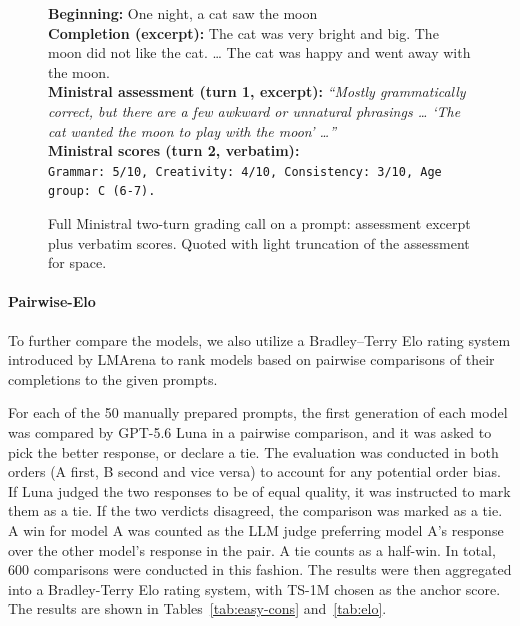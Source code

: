 \documentclass{article}
\newif\ifmarkup
\DeclareRobustCommand{\ins}[1]{\ifmarkup\textbf{#1}\else#1\fi}
\DeclareRobustCommand{\del}[1]{\ifmarkup\sout{#1}\fi}
\begin{document}
\begin{figure}[H]
  \centering
  \begin{tcolorbox}[storybox, title={Ministral grading call (TTS-33M)}]
    \textbf{Beginning:} One night, a cat saw the moon \\[4pt]
    \textbf{Completion (excerpt):} The cat was very bright and big. The moon did not like the cat. \ldots{} The cat was happy and went away with the moon. \\[4pt]
    \textbf{Ministral assessment (turn 1, excerpt):} \textit{``Mostly grammatically correct, but there are a few awkward or unnatural phrasings \ldots{} `The cat wanted the moon to play with the moon' \ldots''} \\[4pt]
    \textbf{Ministral scores (turn 2, verbatim):} \\
    \texttt{Grammar: 5/10, Creativity: 4/10, Consistency: 3/10, Age group: C (6-7).}
  \end{tcolorbox}
  \caption{Full Ministral two-turn grading call on a prompt: assessment excerpt plus verbatim scores. Quoted with light truncation of the assessment for space.}
  \label{fig:ministral-example}
\end{figure}

\paragraph{Pairwise-Elo}
To further compare the models, we also utilize a Bradley--Terry Elo rating system \cite{chiang2024chatbot} introduced by LMArena to rank models based on pairwise comparisons of their completions to the given prompts.

For each of the 50 manually prepared prompts, the first generation of each model was compared by GPT-5.6 Luna in a pairwise comparison, and it was asked to pick the better response, or declare a tie. The evaluation was conducted in both orders (A first, B second and vice versa) to account for any potential order bias. If Luna judged the two responses to be of equal quality, it was instructed to mark them as a tie. If the two verdicts disagreed, the comparison was marked as a tie. A win for model A was counted as the LLM judge preferring model A’s response over the other model’s response in the pair. A tie counts as a half-win. In total, 600 comparisons were conducted in this fashion. The results were then aggregated into a Bradley-Terry Elo rating system, with TS-1M chosen as the anchor score. The results are shown in \ins{Tables~\ref{tab:easy-cons} and~}\del{Table }\ref{tab:elo}. 
\end{document}
